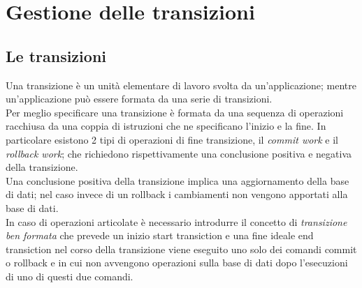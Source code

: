\label{capitolo1}
\section{Gestione delle transizioni}
\subsection{Le transizioni}
Una transizione è un unità elementare di lavoro svolta da un'applicazione; mentre un'applicazione può essere formata da una serie di transizioni.\\
Per meglio specificare una transizione è formata da una sequenza di operazioni racchiusa da una coppia di istruzioni che ne specificano l'inizio e la fine.
In  particolare esistono 2 tipi di operazioni di fine transizione, il \emph{commit work} e il \emph{rollback work}; che richiedono rispettivamente una conclusione positiva e negativa della transizione.\\
Una conclusione positiva della transizione implica una aggiornamento della base di dati; nel caso invece di un rollback i cambiamenti non vengono apportati alla base di dati.\\
In caso di operazioni articolate è necessario introdurre il concetto di \emph{transizione ben formata} che prevede un inizio \textsf{start transiction} e una fine ideale \textsf{end transiction} nel corso della transizione viene eseguito uno solo dei comandi \textsf{commit} o \textsf{rollback} e in cui non avvengono operazioni sulla base di dati dopo l'esecuzioni di uno di questi due comandi.
